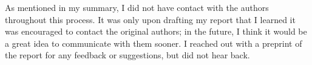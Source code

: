 As mentioned in my summary, I did not have contact with the authors throughout this process. It was only upon drafting my report that I learned it was encouraged to contact the original authors; in the future, I think it would be a great idea to communicate with them sooner. I reached out with a preprint of the report for any feedback or suggestions, but did not hear back. 




